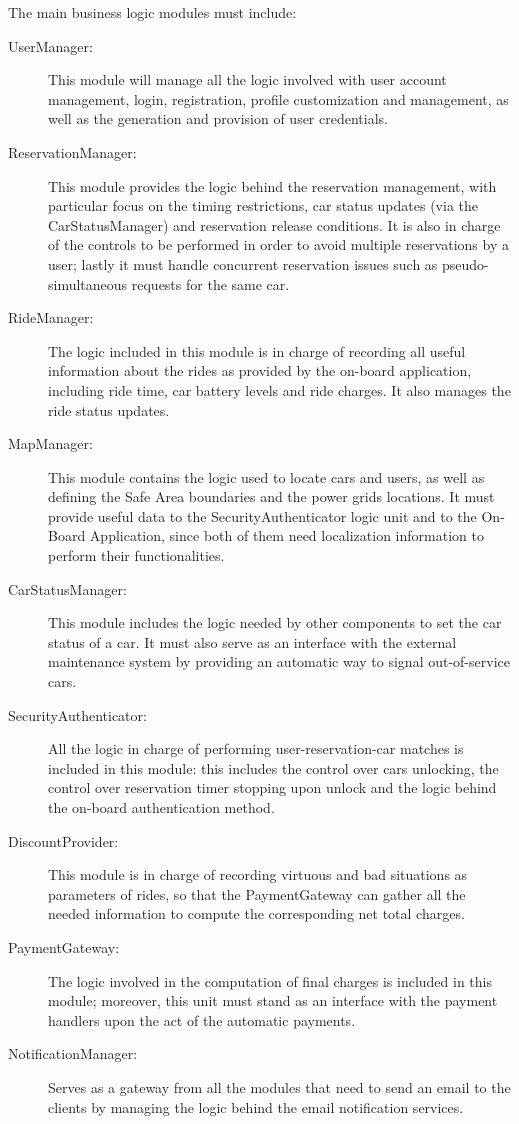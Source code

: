 The main business logic modules must include:

\begin{description}
\item[UserManager:] This module will manage all the logic involved with user account management, login, registration, profile customization and management, as well as the generation and provision of user credentials.
\item[ReservationManager:] This module provides the logic behind the reservation management, with particular focus on the timing restrictions, car status updates (via the CarStatusManager) and reservation release conditions. It is also in charge of the controls to be performed in order to avoid multiple reservations by a user; lastly it must handle concurrent reservation issues such as pseudo-simultaneous requests for the same car.
\item[RideManager:] The logic included in this module is in charge of recording all useful information about the rides as provided by the on-board application, including ride time, car battery levels and ride charges. It also manages the ride status updates.
\item[MapManager:] This module contains the logic used to locate cars and users, as well as defining the Safe Area boundaries and the power grids locations. It must provide useful data to the SecurityAuthenticator logic unit and to the On-Board Application, since both of them need localization information to perform their functionalities.
\item[CarStatusManager:] This module includes the logic needed by other components to set the car status of a car. It must also serve as an interface with the external maintenance system by providing an automatic way to signal out-of-service cars.
\item[SecurityAuthenticator:] All the logic in charge of performing user-reservation-car matches is included in this module: this includes the control over cars unlocking, the control over reservation timer stopping upon unlock and the logic behind the on-board authentication method.
\item[DiscountProvider:] This module is in charge of recording virtuous and bad situations as parameters of rides, so that the PaymentGateway can gather all the needed information to compute the corresponding net total charges.
\item[PaymentGateway:] The logic involved in the computation of final charges is included in this module; moreover, this unit must stand as an interface with the payment handlers upon the act of the automatic payments.
\item[NotificationManager:] Serves as a gateway from all the modules that need to send an email to the clients by managing the logic behind the email notification services.
\end{description}

